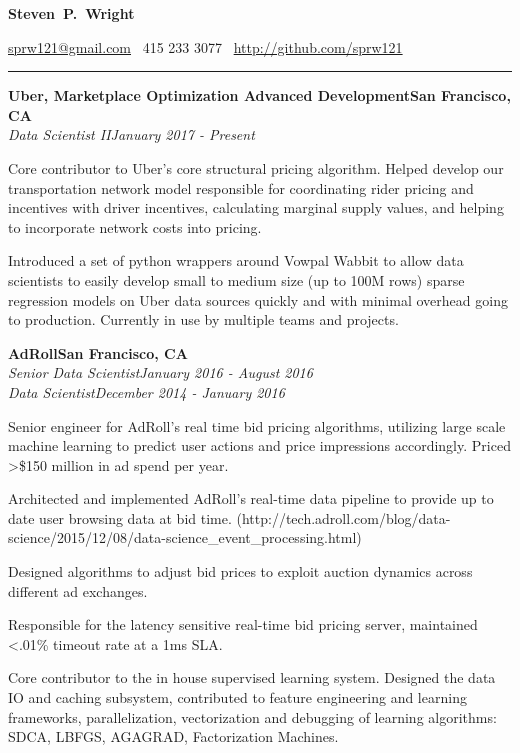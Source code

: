 \documentclass{article}
\newcommand{\ressection}[1]{\noindent{\large\textbf{#1}}\vspace{2pt}\hrule\vspace{4pt}}
\newcommand{\leftandright}[2]{\noindent\textbf{#1}\hfill\textbf{#2}}
\newcommand{\leftandrighti}[2]{\indent\textit{#1}\hfill\textit{#2}}
\begin{document}
\sffamily

\begin{center}
\textbf{\huge{Steven~P.~Wright}}

\href{mailto:sprw121@gmail.com}{sprw121@gmail.com}
\textbullet\, 415 233 3077
\textbullet\, \href{https://github.com/sprw121}{http://github.com/sprw121}
\end{center}

\ressection{Work experience}

\leftandright{Uber, Marketplace Optimization Advanced Development}{San Francisco, CA} \\
\leftandrighti{Data Scientist II}
	      {January 2017 - Present}
\begin{itemize*}
\item Core contributor to Uber's core structural pricing algorithm. Helped develop our transportation network model responsible for coordinating rider pricing and incentives with driver incentives, calculating marginal supply values, and helping to incorporate network costs into pricing.
\item Introduced a set of python wrappers around Vowpal Wabbit to allow data scientists to easily develop small to medium size (up to 100M rows) sparse regression models on Uber data sources quickly and with minimal overhead going to production. Currently in use by multiple teams and projects.
\end{itemize*}

\leftandright{AdRoll}{San Francisco, CA} \\
\leftandrighti{Senior Data Scientist}
	      {January 2016 - August 2016}\\
\leftandrighti{Data Scientist}
	      {December 2014 - January 2016}

\begin{itemize*}
\item Senior engineer for AdRoll's real time bid pricing algorithms, utilizing
  large scale machine learning to predict user actions and price impressions accordingly.
  Priced \textgreater \$150 million in ad spend per year.
\item Architected and implemented AdRoll's real-time data pipeline to provide up to date
  user browsing data at bid time. (http://tech.adroll.com/blog/data-science/2015/12/08/data-science\_event\_processing.html)
\item Designed algorithms to adjust bid prices to exploit auction dynamics across
  different ad exchanges.
\item Responsible for the latency sensitive real-time bid pricing server,
  maintained \textless .01\% timeout rate at a 1ms SLA.
\item Core contributor to the in house supervised learning system. Designed the
  data IO and caching subsystem, contributed to feature engineering and learning frameworks,
  parallelization, vectorization and debugging of learning algorithms: SDCA, LBFGS, AGAGRAD,
  Factorization Machines.
\end{itemize*}
\end{document}
